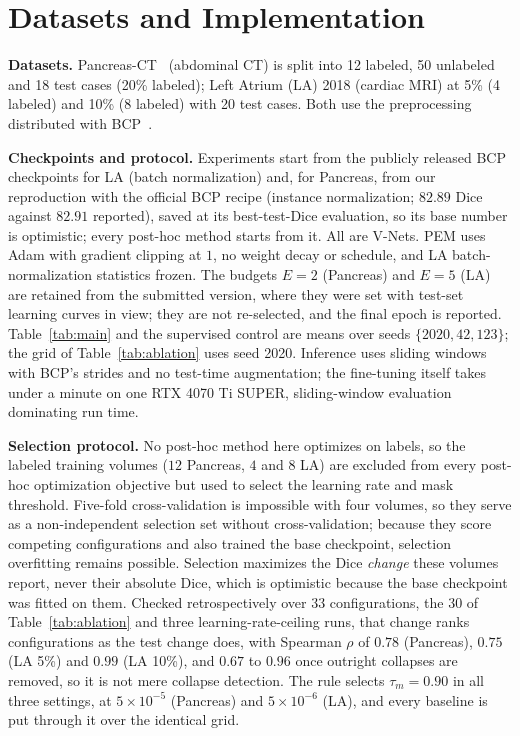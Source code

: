 \documentclass[conference]{IEEEtran}
\begin{document}
\section{Datasets and Implementation}
\label{sec:data}
\noindent\textbf{Datasets.}
Pancreas-CT~\cite{roth2015pancreas} (abdominal CT) is split into 12 labeled, 50 unlabeled and 18 test cases (20\% labeled); Left Atrium (LA) 2018 (cardiac MRI) at 5\% (4 labeled) and 10\% (8 labeled) with 20 test cases. Both use the preprocessing distributed with BCP~\cite{bai2023bcp}.

\noindent\textbf{Checkpoints and protocol.}
Experiments start from the publicly released BCP checkpoints for LA (batch normalization) and, for Pancreas, from our reproduction with the official BCP recipe (instance normalization; $82.89$ Dice against $82.91$ reported), saved at its best-test-Dice evaluation, so its base number is optimistic; every post-hoc method starts from it. All are V-Nets. PEM uses Adam with gradient clipping at $1$, no weight decay or schedule, and LA batch-normalization statistics frozen. The budgets $E=2$ (Pancreas) and $E=5$ (LA) are retained from the submitted version, where they were set with test-set learning curves in view; they are not re-selected, and the final epoch is reported. Table~\ref{tab:main} and the supervised control are means over seeds $\{2020,42,123\}$; the grid of Table~\ref{tab:ablation} uses seed 2020. Inference uses sliding windows with BCP's strides and no test-time augmentation; the fine-tuning itself takes under a minute on one RTX 4070 Ti SUPER, sliding-window evaluation dominating run time.

\noindent\textbf{Selection protocol.}
No post-hoc method here optimizes on labels, so the labeled training volumes ($12$ Pancreas, $4$ and $8$ LA) are excluded from every post-hoc optimization objective but used to select the learning rate and mask threshold. Five-fold cross-validation is impossible with four volumes, so they serve as a non-independent selection set without cross-validation; because they score competing configurations and also trained the base checkpoint, selection overfitting remains possible. Selection maximizes the Dice \emph{change} these volumes report, never their absolute Dice, which is optimistic because the base checkpoint was fitted on them. Checked retrospectively over $33$ configurations, the $30$ of Table~\ref{tab:ablation} and three learning-rate-ceiling runs, that change ranks configurations as the test change does, with Spearman $\rho$ of $0.78$ (Pancreas), $0.75$ (LA 5\%) and $0.99$ (LA 10\%), and $0.67$ to $0.96$ once outright collapses are removed, so it is not mere collapse detection. The rule selects $\tau_m=0.90$ in all three settings, at $5\times10^{-5}$ (Pancreas) and $5\times10^{-6}$ (LA), and every baseline is put through it over the identical grid.
\end{document}
